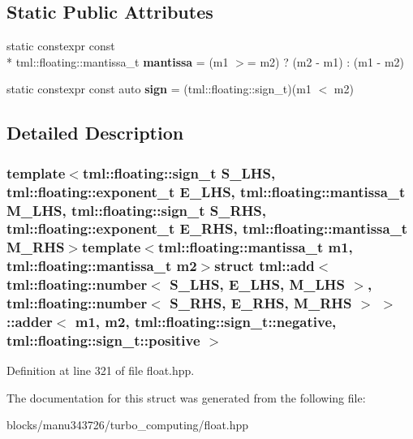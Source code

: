 \subsection*{Static Public Attributes}
\begin{DoxyCompactItemize}
\item 
\hypertarget{structtml_1_1add_3_01tml_1_1floating_1_1number_3_01_s___l_h_s_00_01_e___l_h_s_00_01_m___l_h_s_01092b317c83488a1c5a1535bde017143b_a371b229704f0ef79c32b50eaa7b82319}{static constexpr const \\*
tml\+::floating\+::mantissa\+\_\+t {\bfseries mantissa} = (m1 $>$= m2) ? (m2 -\/ m1) \+: (m1 -\/ m2)}\label{structtml_1_1add_3_01tml_1_1floating_1_1number_3_01_s___l_h_s_00_01_e___l_h_s_00_01_m___l_h_s_01092b317c83488a1c5a1535bde017143b_a371b229704f0ef79c32b50eaa7b82319}

\item 
\hypertarget{structtml_1_1add_3_01tml_1_1floating_1_1number_3_01_s___l_h_s_00_01_e___l_h_s_00_01_m___l_h_s_01092b317c83488a1c5a1535bde017143b_aea3cb465245357a22c9c8ac7afc2f6a3}{static constexpr const auto {\bfseries sign} = (tml\+::floating\+::sign\+\_\+t)(m1 $<$ m2)}\label{structtml_1_1add_3_01tml_1_1floating_1_1number_3_01_s___l_h_s_00_01_e___l_h_s_00_01_m___l_h_s_01092b317c83488a1c5a1535bde017143b_aea3cb465245357a22c9c8ac7afc2f6a3}

\end{DoxyCompactItemize}


\subsection{Detailed Description}
\subsubsection*{template$<$tml\+::floating\+::sign\+\_\+t S\+\_\+\+L\+H\+S, tml\+::floating\+::exponent\+\_\+t E\+\_\+\+L\+H\+S, tml\+::floating\+::mantissa\+\_\+t M\+\_\+\+L\+H\+S, tml\+::floating\+::sign\+\_\+t S\+\_\+\+R\+H\+S, tml\+::floating\+::exponent\+\_\+t E\+\_\+\+R\+H\+S, tml\+::floating\+::mantissa\+\_\+t M\+\_\+\+R\+H\+S$>$template$<$tml\+::floating\+::mantissa\+\_\+t m1, tml\+::floating\+::mantissa\+\_\+t m2$>$struct tml\+::add$<$ tml\+::floating\+::number$<$ S\+\_\+\+L\+H\+S, E\+\_\+\+L\+H\+S, M\+\_\+\+L\+H\+S $>$, tml\+::floating\+::number$<$ S\+\_\+\+R\+H\+S, E\+\_\+\+R\+H\+S, M\+\_\+\+R\+H\+S $>$ $>$\+::adder$<$ m1, m2, tml\+::floating\+::sign\+\_\+t\+::negative, tml\+::floating\+::sign\+\_\+t\+::positive $>$}



Definition at line 321 of file float.\+hpp.



The documentation for this struct was generated from the following file\+:\begin{DoxyCompactItemize}
\item 
blocks/manu343726/turbo\+\_\+computing/float.\+hpp\end{DoxyCompactItemize}
